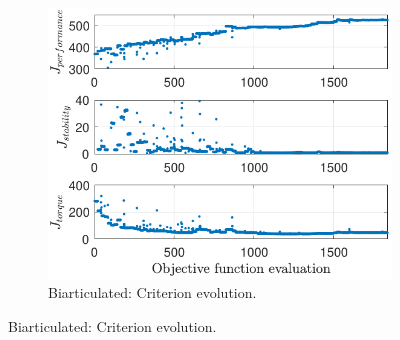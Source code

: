 \documentclass[letterpaper, 10 pt, conference]{ieeeconf}  %
\begin{document}
\begin{figure}[ht]
\begin{subfigure}[t]{0.32\linewidth}
		\end{subfigure}
		\begin{subfigure}[t]{0.32\linewidth}
			\includegraphics[width=\linewidth]{bi/crit_high}
			\caption{Biarticulated: Criterion evolution.}
			\label{fig:bi_crit_high}
		\end{subfigure}
		
		\vspace{1mm}
		

\end{figure}
\end{document}

